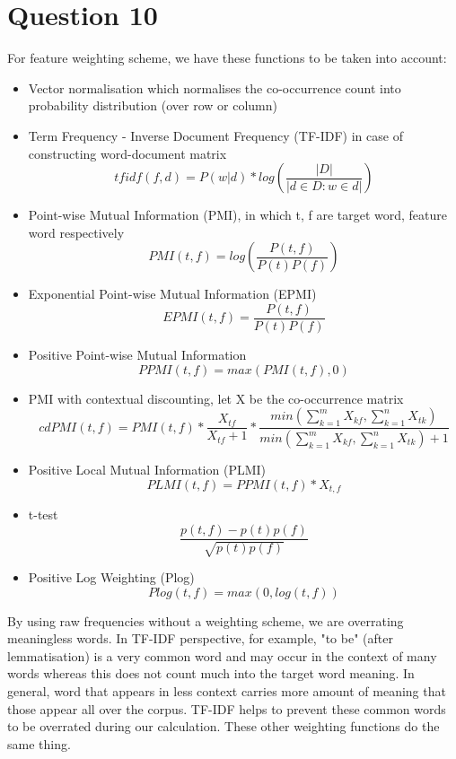 \documentclass[12pt]{article}
\begin{document}
\section{Question 10}
For feature weighting scheme, we have these functions to be taken into account:
\begin{itemize}
	\item Vector normalisation which normalises the co-occurrence count into probability distribution (over row or column)
	\item Term Frequency - Inverse Document Frequency (TF-IDF) in case of constructing word-document matrix
	\[tfidf(f,d) = P(w|d)*log\left(\frac{|D|}{|d\in D: w\in d|}\right)\]
	\item Point-wise Mutual Information (PMI), in which t, f are target word, feature word respectively
	\[PMI(t,f)=log\left(\frac{P(t,f)}{P(t)P(f)}\right)\]
	\item Exponential Point-wise Mutual Information (EPMI)
	\[EPMI(t,f)=\frac{P(t,f)}{P(t)P(f)}\]
	\item Positive Point-wise Mutual Information
	\[PPMI(t,f) = max(PMI(t,f), 0)\]
	\item PMI with contextual discounting\cite{pantel2002discovering}, let X be the co-occurrence matrix
	\[cdPMI(t,f)=PMI(t,f)*\frac{X_{tf}}{X_{tf}+1}*\frac{min(\sum_{k=1}^{m}X_{kf},\sum_{k=1}^{n}X_{tk})}{min(\sum_{k=1}^{m}X_{kf},\sum_{k=1}^{n}X_{tk})+1}\]
	\item Positive Local Mutual Information (PLMI)
	\[PLMI(t,f)=PPMI(t,f)*X_{t,f}\]
	\item t-test
	\[\frac{p(t,f)-p(t)p(f)}{\sqrt{p(t)p(f)}}\]
	\item Positive Log Weighting (Plog)
	\[Plog(t,f)=max(0,log(t,f))\]
\end{itemize}

By using raw frequencies without a weighting scheme, we are overrating meaningless words. In TF-IDF perspective, for example, "to be" (after lemmatisation) is a very common word and may occur in the context of many words whereas this does not count much into the target word meaning. In general, word that appears in less context carries more amount of meaning that those appear all over the corpus. TF-IDF helps to prevent these common words to be overrated during our calculation. These other weighting functions do the same thing.
\end{document}
